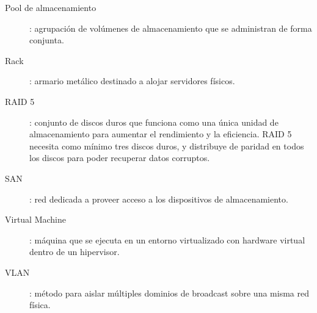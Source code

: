 \begin{description}
 \item [Pool de almacenamiento]: agrupación de volúmenes de almacenamiento que se administran de forma conjunta.
 \label{itm:pool-almacenamiento}
 \label{itm:qos}
 \item [Rack]: armario metálico destinado a alojar servidores físicos.
 \label{itm:rack}
 \item [RAID 5]: conjunto de discos duros que funciona como una única unidad de almacenamiento para aumentar el rendimiento y la eficiencia. RAID 5 necesita como mínimo tres discos duros, y distribuye de paridad en todos los discos para poder recuperar datos corruptos.
 \label{itm:raid5}
 \item [SAN]: red dedicada a proveer acceso a los dispositivos de almacenamiento.
 \label{itm:san}
\item [Virtual Machine]: máquina que se ejecuta en un entorno virtualizado con hardware virtual dentro de un hipervisor.
\label{itm:vm}
 \item [VLAN]: método para aislar múltiples dominios de broadcast sobre una misma red física.
 \label{itm:vlan}


\end{description}
